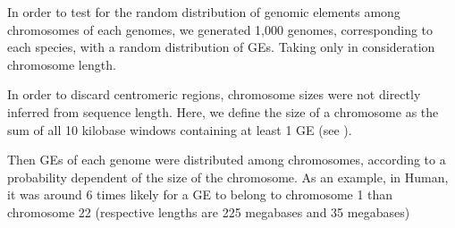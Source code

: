 In order to test for the random distribution of genomic elements among chromosomes of each genomes, we generated  1,000 genomes, corresponding to each species, with a random distribution of GEs. Taking only in consideration chromosome length.

In order to discard centromeric regions, chromosome sizes were not directly inferred from sequence length. Here, we define the size of a chromosome as the sum of all 10 kilobase windows containing at least 1 GE (see ).

Then GEs of each genome were distributed among chromosomes, according to a probability dependent of the size of the chromosome. As an example, in Human,  it was around 6 times likely for a GE to belong to chromosome 1 than chromosome 22 (respective lengths are 225 megabases and 35 megabases)

